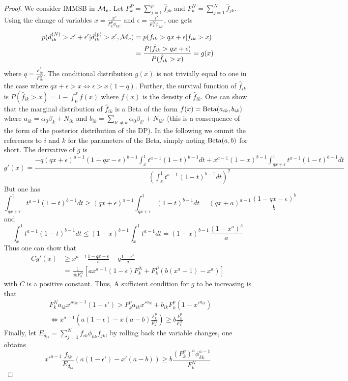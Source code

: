 \begin{proof}

We consider IMMSB in $\mathcal{M}_e$. Let $F_k^P=\sum_{j=1}^p \hat f_{jk}$ and $F_k^N=\sum_{j=1}^N \hat f_{jk}$. 
Using the change of variables $x=\frac{x'}{F_k^p \phi_{kk'}}$ and $\epsilon = \frac{\epsilon'}{F_k^N \phi_{kk'}}$, one gets
\begin{align*}
p(d_{ik}^{(N)} > x'+\epsilon' | d_{ik}^{(p)} > x', \mathcal{M}_e) &= p(f_{ik} > qx+\epsilon | f_{ik} > x) \\
&=\frac{P(\hat f_{ik} > qx+\epsilon)}{P(\hat f_{ik} > x)} = g(x)
\end{align*}
where $q=\frac{F_{ik}^p}{F_{ik}^N}$. The conditional distribution $g(x)$ is not trivially equal to one in the case where $qx+\epsilon > x \Leftrightarrow \epsilon > x(1-q)$. Further, the survival function of $\hat f_{ik}$ is $P(\hat f_{ik} >x) = 1-\int_0^x f(x)$ where $f(x)$ is the density of $\hat f_{ik}$. One can show that the marginal distribution of $\hat f_{ik}$ is a Beta of the form $f(x)=\mathrm{Beta}(a_{ik}, b_{ik})$  where $a_{ik} = \alpha_0\beta_k + N_{ik}$ and $b_{ik} = \sum_{k'\neq k} \alpha_0\beta_{k'} + N_{ik'}$  (this is a consequence of the form of the posterior distribution of the DP). In the following we ommit the references to $i$ and $k$ for the parameters of the Beta, simply noting $\mathrm{Beta}(a, b)$ for short. The derivative of $g$ is
\begin{equation*}
g'(x) = \frac{-q (qx+\epsilon)^{a-1}(1-qx-\epsilon)^{b-1}\int_x^1t^{a-1} (1-t)^{b-1} dt + x^{a-1}(1-x)^{b-1}\int_{qx+\epsilon}^1 t^{a-1}(1-t)^{b-1} dt}{\left(\int_x^1t^{a-1}(1-t)^{b-1}dt\right)^2}
\end{equation*}
But one has
\begin{equation*}
\int_{qx+\epsilon}^1 t^{a-1}(1-t)^{b-1}dt \geq (qx+\epsilon)^{a-1}\int_{qx+\epsilon}^1 (1-t)^{b-1}dt = (qx+a)^{a-1}\frac{(1-qx-\epsilon)^b}{b}
\end{equation*}
and
\begin{equation*}
\int_x^1 t^{a-1}(1-t)^{b-1}dt \leq (1-x)^{b-1}\int_x^1 t^{a-1}dt = (1-x)^{b-1}\frac{(1-x^a)^b}{a}
\end{equation*}
Thus one can show that
\begin{align*}
Cg'(x) &\geq x^{a-1} \frac{1-qx-\epsilon}{b} -q\frac{1-x^a}{a}  \\
        &= \frac{1}{abF_k^N} \left[ ax^{a-1}(1-\epsilon)F_k^N + F_k^P (b(x^a-1) - x^a) \right]
\end{align*}
with $C$ is a positive constant. Thus, A sufficient condition for $g$ to be increasing is that
\begin{align*}
&F_k^N a_{ik} x'^{a_{ik}-1} (1-\epsilon') > F_k^p a_{ik} x'^{a_{ik}} + b_{ik} F_k^p (1-x'^{a_{ik}}) \\
&\Leftrightarrow x^{a-1} \left(a(1-\epsilon) - x(a-b)\frac{F_k^p}{F_k^N} \right) \geq b \frac{F_k^p}{F_k^N}
\end{align*}
Finally, let $E_{d_{ik}}=\sum_{j=1}^N f_{ik}\phi_{kk}f_{jk}$, by rolling back the variable changes,  one obtains
\begin{equation*}
x'^{a-1}\frac{f_{ik}}{E_{d_{ik}}}\left(a(1-\epsilon') -x'(a-b) \right) \geq b\frac{(F_k^p)^{a}\phi_{kk}^{a-1}}{F_k^N}
\end{equation*}



\end{proof}
